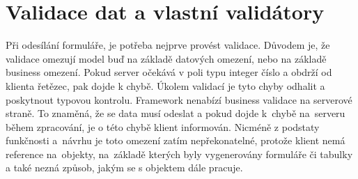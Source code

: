 \section{Validace dat a vlastní validátory}
Při odesílání formuláře, je potřeba nejprve provést validace. Důvodem je, že validace omezují model buď na základě datových omezení, nebo na základě business omezení. Pokud server očekává v poli typu integer číslo a obdrží od klienta řetězec, pak dojde k chybě. Úkolem validací je tyto chyby odhalit a poskytnout typovou kontrolu. Framework nenabízí business validace na serverové straně. To znaměná, že se data musí odeslat a pokud dojde k~chybě na~serveru během zpracování, je o této chybě klient informován. Nicméně z podstaty funkčnosti a~návrhu je toto omezení zatím nepřekonatelné, protože klient nemá reference na~objekty, na~základě kterých byly vygenerovány formuláře či tabulky a také nezná způsob, jakým se s objektem dále pracuje. 
